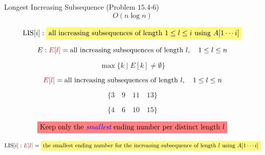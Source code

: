 \begin{frame}{}
  \begin{exampleblock}{Longest Increasing Subsequence (Problem $15.4$-$6$)}
    \[
      O(n \log n)
    \]
  \end{exampleblock}

  \[
    \text{LIS}[i]: \hl{yellow}{\text{all increasing subsequences of length $1 \le l \le i$ using $A[1 \cdots i]$}}
  \]

  \pause
  \[
    E: \textcolor{red}{E[l]} = \text{all increasing subsequences of length $l$}, \quad 1 \le l \le n
  \]

  \pause
  \[
    \max \{k \mid E[k] \neq \emptyset \}
  \]
\end{frame}

\begin{frame}{}
  \[
    \textcolor{red}{E[l]} = \text{all increasing subsequences of length $l$}, \quad 1 \le l \le n
  \]

  \pause
  \[
    \{3\quad 9\quad 11\quad 13\}
  \]

  \[
    \{4\quad 6\quad 10\quad 15\}
  \]

  \pause
  \[
    \text{\hl{red}{Keep only the \blue{\it smallest} ending number per distinct length $l$}}
  \]

  \[
    \text{LIS}[i]: \red{E[l]} = \hl{yellow}{\text{the smallest ending number for the increasing subsequence of length $l$ using $A[1 \cdots i]$}}
  \]
\end{frame}

\begin{frame}{}
\end{frame}

\begin{frame}{}
\end{frame}

